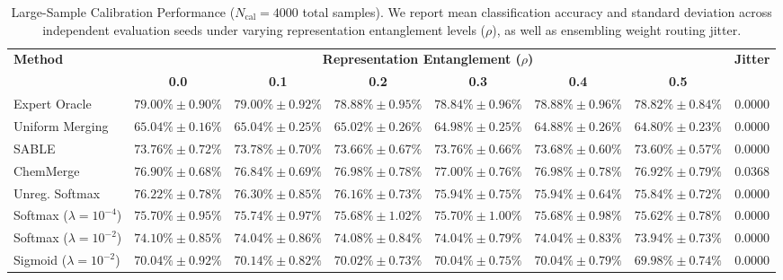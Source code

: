 \begin{table}[t]
\caption{Large-Sample Calibration Performance ($N_{\text{cal}} = 4000$ total samples). We report mean classification accuracy and standard deviation across independent evaluation seeds under varying representation entanglement levels ($\rho$), as well as ensembling weight routing jitter.}
\label{tab:large_sample}
\vskip 0.15in
\begin{center}
\begin{scriptsize}
\begin{sc}
\setlength{\tabcolsep}{2.2pt}
\begin{tabular}{lccccccc}
\toprule
\textbf{Method} & \multicolumn{6}{c}{\textbf{Representation Entanglement ($\rho$)}} & \textbf{Jitter} \\
\cmidrule(lr){2-7}
& \textbf{0.0} & \textbf{0.1} & \textbf{0.2} & \textbf{0.3} & \textbf{0.4} & \textbf{0.5} & \\
\midrule
Expert Oracle & $79.00\% \pm 0.90\%$ & $79.00\% \pm 0.92\%$ & $78.88\% \pm 0.95\%$ & $78.84\% \pm 0.96\%$ & $78.88\% \pm 0.96\%$ & $78.82\% \pm 0.84\%$ & $0.0000$ \\
Uniform Merging & $65.04\% \pm 0.16\%$ & $65.04\% \pm 0.25\%$ & $65.02\% \pm 0.26\%$ & $64.98\% \pm 0.25\%$ & $64.88\% \pm 0.26\%$ & $64.80\% \pm 0.23\%$ & $0.0000$ \\
SABLE & $73.76\% \pm 0.72\%$ & $73.78\% \pm 0.70\%$ & $73.66\% \pm 0.67\%$ & $73.76\% \pm 0.66\%$ & $73.68\% \pm 0.60\%$ & $73.60\% \pm 0.57\%$ & $0.0000$ \\
ChemMerge & $76.90\% \pm 0.68\%$ & $76.84\% \pm 0.69\%$ & $76.98\% \pm 0.78\%$ & $77.00\% \pm 0.76\%$ & $76.98\% \pm 0.78\%$ & $76.92\% \pm 0.79\%$ & $0.0368$ \\
\midrule
Unreg. Softmax & $76.22\% \pm 0.78\%$ & $76.30\% \pm 0.85\%$ & $76.16\% \pm 0.73\%$ & $75.94\% \pm 0.75\%$ & $75.94\% \pm 0.64\%$ & $75.84\% \pm 0.72\%$ & $0.0000$ \\
Softmax ($\lambda=10^{-4}$) & $75.70\% \pm 0.95\%$ & $75.74\% \pm 0.97\%$ & $75.68\% \pm 1.02\%$ & $75.70\% \pm 1.00\%$ & $75.68\% \pm 0.98\%$ & $75.62\% \pm 0.78\%$ & $0.0000$ \\
Softmax ($\lambda=10^{-2}$) & $74.10\% \pm 0.85\%$ & $74.04\% \pm 0.86\%$ & $74.08\% \pm 0.84\%$ & $74.04\% \pm 0.79\%$ & $74.04\% \pm 0.83\%$ & $73.94\% \pm 0.73\%$ & $0.0000$ \\
Sigmoid ($\lambda=10^{-2}$) & $70.04\% \pm 0.92\%$ & $70.14\% \pm 0.82\%$ & $70.02\% \pm 0.73\%$ & $70.04\% \pm 0.75\%$ & $70.04\% \pm 0.79\%$ & $69.98\% \pm 0.74\%$ & $0.0000$ \\
\bottomrule
\end{tabular}
\end{sc}
\end{scriptsize}
\end{center}
\vskip -0.1in
\end{table}


